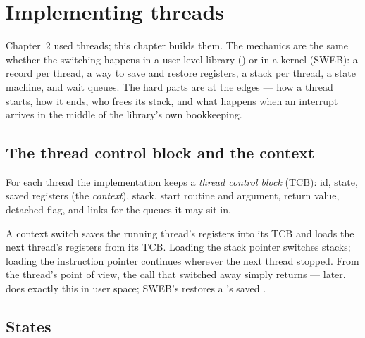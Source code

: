 \chapter{Implementing threads}
\label{ch:impl}

Chapter~2 used threads; this chapter builds them. The mechanics are the
same whether the switching happens in a user-level library
() or in a kernel (SWEB): a record per thread, a way to save
and restore registers, a stack per thread, a state machine, and wait
queues. The hard parts are at the edges --- how a thread starts, how it
ends, who frees its stack, and what happens when an interrupt arrives in
the middle of the library's own bookkeeping.

\section{The thread control block and the context}

For each thread the implementation keeps a \emph{thread control block}
(TCB): id, state, saved registers (the \emph{context}), stack, start
routine and argument, return value, detached flag, and links for the
queues it may sit in.

A context switch saves the running thread's registers into its TCB and
loads the next thread's registers from its TCB. Loading the stack pointer
switches stacks; loading the instruction pointer continues wherever the
next thread stopped. From the thread's point of view, the call that
switched away simply returns --- later. 
does exactly this in user space; SWEB's 
restores a 's saved .

\section{States}

